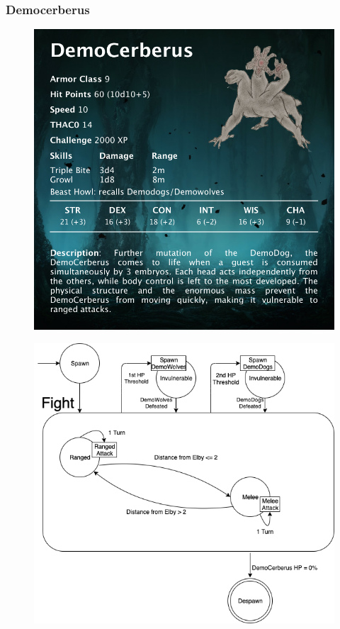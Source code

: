 \subsubsection{Democerberus}
\vspace*{0.3cm}
\begin{figure}[H]
	\centering
	\includegraphics[width=0.9\linewidth]{images/visual_stats/democerberus.png}
\end{figure}
\newpage
\begin{figure}[H]
	\centering
	\includegraphics[width=0.9\linewidth]{images/graphs/fsa/fsa_democerberus.png}
\end{figure}

